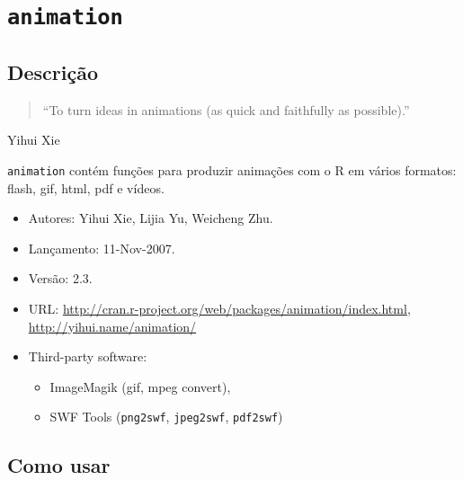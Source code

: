 \section{\texttt{animation}}


\subsection{Descrição}

\begin{frame}

  \begin{quote}
    ``To turn ideas in animations (as quick and faithfully as
    possible).''
  \end{quote}
  \hspace{0.66\linewidth} Yihui Xie
  \vspace{\baselineskip}

  \texttt{animation} contém funções para produzir animações com o R em
  vários formatos: flash, gif, html, pdf e vídeos.

  \begin{itemize}
  \item Autores: Yihui Xie, Lijia Yu, Weicheng Zhu.
  \item Lançamento: 11-Nov-2007.
  \item Versão: 2.3.
  \item URL:
    \url{http://cran.r-project.org/web/packages/animation/index.html},
    \url{http://yihui.name/animation/}
  \item Third-party software:
    \begin{itemize}
    \item ImageMagik (gif, mpeg convert),
    \item SWF Tools (\texttt{png2swf}, \texttt{jpeg2swf},
      \texttt{pdf2swf})
    \end{itemize}
  \end{itemize}

\end{frame}


\subsection{Como usar}

